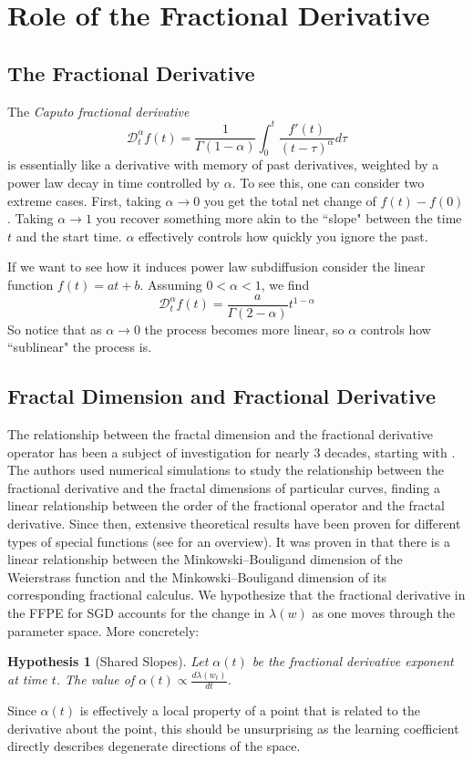 \documentclass{article} %
\newtheorem{hypothesis}{Hypothesis}[section]
\theoremstyle{definition}
\begin{document}
\section{Role of the Fractional Derivative}\label{app:frac_deriv}
\subsection{The Fractional Derivative}
The \textit{Caputo fractional derivative}
\begin{equation}
    \mathcal{D}^\alpha_t f(t) = \frac{1}{\Gamma(1-\alpha)} \int_0^t \frac{f'(t)}{(t-\tau)^\alpha} d\tau
\end{equation}
is essentially like a derivative with memory of past derivatives, weighted by a power law decay in time controlled by $\alpha$. To see this, one can consider two extreme cases. First, taking $\alpha \to 0$ you get the total net change of $f(t) - f(0)$. Taking $\alpha \to 1$ you recover something more akin to the ``slope" between the time $t$ and the start time. $\alpha$ effectively controls how quickly you ignore the past.

If we want to see how it induces power law subdiffusion consider the linear function $f(t) = at + b$. Assuming $0 < \alpha < 1$, we find
\begin{equation}
    \mathcal{D}^\alpha_t f(t) = \frac{a}{\Gamma(2-\alpha)} t^{1-\alpha}
\end{equation}
So notice that as $\alpha \to 0$ the process becomes more linear, so $\alpha$ controls how ``sublinear" the process is.

\subsection{Fractal Dimension and Fractional Derivative}
The relationship between the fractal dimension and the fractional derivative operator has been a subject of investigation for nearly 3 decades, starting with \citep{fractals_fractional_calc}. The authors used numerical simulations to study the relationship between the fractional derivative and the fractal dimensions of particular curves, finding a linear relationship between the order of the fractional operator and the fractal derivative. Since then, extensive theoretical results have been proven for different types of special functions (see \citep{Liang2024} for an overview). It was proven in \citep{Songping2004ONTF} that there is a linear relationship between the Minkowski–Bouligand dimension of the Weierstrass function and the Minkowski–Bouligand dimension of its corresponding fractional calculus. We hypothesize that the fractional derivative in the FFPE for SGD accounts for the change in $\lambda(w)$ as one moves through the parameter space. More concretely:
\begin{hypothesis}[Shared Slopes]
Let $\alpha(t)$ be the fractional derivative exponent at time $t$. The value of $\alpha(t) \propto \frac{d \lambda(w_t)}{dt}$.
\end{hypothesis}
Since $\alpha(t)$ is effectively a local property of a point that is related to the derivative about the point, this should be unsurprising as the learning coefficient directly describes degenerate directions of the space. 
\end{document}
